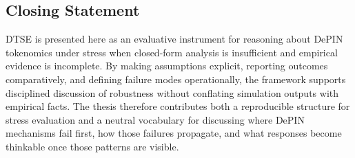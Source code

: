 \subsection{Closing Statement}
DTSE is presented here as an evaluative instrument for reasoning about DePIN tokenomics under stress when closed-form analysis is insufficient and empirical evidence is incomplete. By making assumptions explicit, reporting outcomes comparatively, and defining failure modes operationally, the framework supports disciplined discussion of robustness without conflating simulation outputs with empirical facts. The thesis therefore contributes both a reproducible structure for stress evaluation and a neutral vocabulary for discussing where DePIN mechanisms fail first, how those failures propagate, and what responses become thinkable once those patterns are visible.
